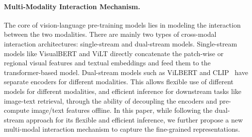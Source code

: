 \paragraph{Multi-Modality Interaction Mechanism.} 
The core of vision-language pre-training models lies in modeling the interaction between the two modalities. 
There are mainly two types of cross-modal interaction architectures: single-stream and dual-stream models. 
Single-stream models like VisualBERT \citep{li2019visualbert} and ViLT \citep{kim2021vilt} directly concatenate the patch-wise or regional visual features and textual embeddings 
and feed them to the transformer-based model.
Dual-stream models such as ViLBERT \citep{lu2019vilbert} and CLIP~\citep{radford2021learning} have separate encoders for different modalities. 
This allows flexible use of different models for different modalities, and
 efficient inference for downstream tasks like image-text retrieval, through the ability of decoupling the encoders and pre-compute image/text features offline.
In this paper, while following the dual-stream approach for its flexible and efficient inference,
we further propose a new multi-modal interaction mechanism to capture the fine-grained representations. 


